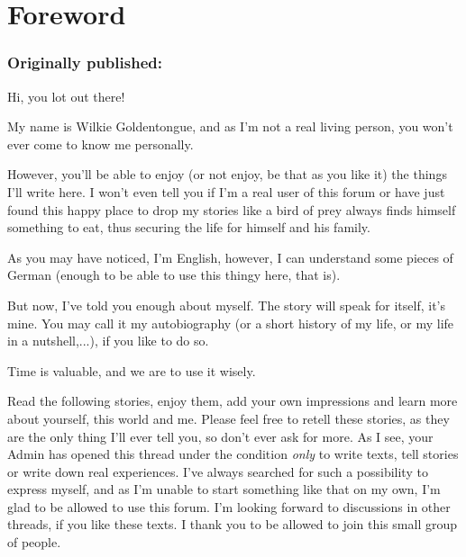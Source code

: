 \frontmatter
\chapter{Foreword}
\label{cha:foreword}
\subsection*{Originally published: }
Hi, you lot out there!

My name is Wilkie Goldentongue, and as I'm not a real living person, you won't ever come to know me personally.

However, you'll be able to enjoy (or not enjoy, be that as you like it) the things I'll write here.
I won't even tell you if I'm a real user of this forum or have just found this happy place to drop my stories like a bird of prey always finds himself something to eat, thus securing the life for himself and his family.

As you may have noticed, I'm English, however, I can understand some pieces of German (enough to be able to use this thingy here, that is). 

But now, I've told you enough about myself. The story will speak for itself, it's mine. You may call it my autobiography (or a short history of my life, or my life in a nutshell,...), if you like to do so. 

Time is valuable, and we are to use it wisely. 

Read the following stories, enjoy them, add your own impressions and learn more about yourself, this world and me. Please feel free to retell these stories, as they are the only thing I'll ever tell you, so don't ever ask for more. As I see, your Admin has opened this thread under the condition \emph{only} to write texts, tell stories or write down real experiences. I've always searched for such a possibility to express myself, and as I'm unable to start something like that on my own, I'm glad to be allowed to use this forum. I'm looking forward to discussions in other threads, if you like these texts. I thank you to be allowed to join this small group of people. 
